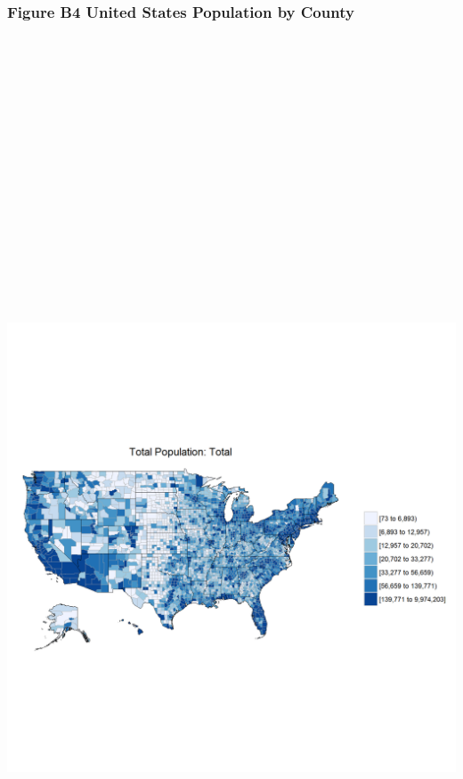 \documentclass[]{article}
\begin{document}
\newpage

\subsubsection{Figure B4 United States Population by
County}\label{figure-b4-united-states-population-by-county}

\section{\texorpdfstring{\protect\includegraphics[height=12.50000in]{images/county_pop.png}}{US Population by County}}\label{us-population-by-county}
\end{document}
